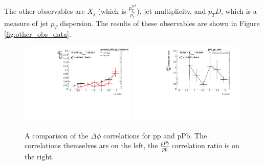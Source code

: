 The other observables are $X_j$ (which is $\frac{p_T^{jet}}{p_T^{\gamma}}$), jet multiplicity, and $p_TD$, which is a measure of jet $p_T$ dispersion. The results of these observables are shown in Figure \ref{fig:other_obs_data}.

\begin{figure}
    \centering
    \includegraphics[width=0.49\textwidth]{GammaJet/pp_pPb_correlations/hadj_dPhiLambda0_pPb_pp_comparison_Comparison.pdf}
    \includegraphics[width=0.49\textwidth]{GammaJet/pp_pPb_correlations/hadj_dPhi_ratiopPb_pp_ratio_Comparison.pdf}
    \caption{A comparison of the $\Delta \phi$ correlations for pp and pPb. The correlations themselves are on the left, the $\frac{pPb}{pp}$ correlation ratio is on the right.}
    \label{fig:dPhidata}
\end{figure}

